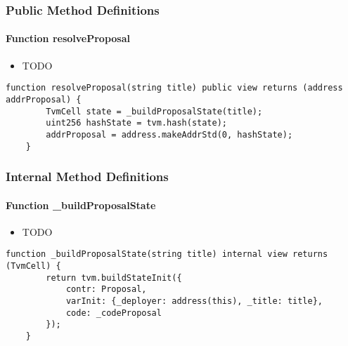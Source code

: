 \subsubsection{Public Method Definitions}


\paragraph{Function resolveProposal}

\begin{itemize}
\item TODO
\end{itemize}

\begin{lstlisting}[firstnumber=8]
    function resolveProposal(string title) public view returns (address addrProposal) {
        TvmCell state = _buildProposalState(title);
        uint256 hashState = tvm.hash(state);
        addrProposal = address.makeAddrStd(0, hashState);
    }
\end{lstlisting}

\subsubsection{Internal Method Definitions}


\paragraph{Function \_{}buildProposalState}

\begin{itemize}
\item TODO
\end{itemize}

\begin{lstlisting}[firstnumber=14]
    function _buildProposalState(string title) internal view returns (TvmCell) {
        return tvm.buildStateInit({
            contr: Proposal,
            varInit: {_deployer: address(this), _title: title},
            code: _codeProposal
        });
    }
\end{lstlisting}
